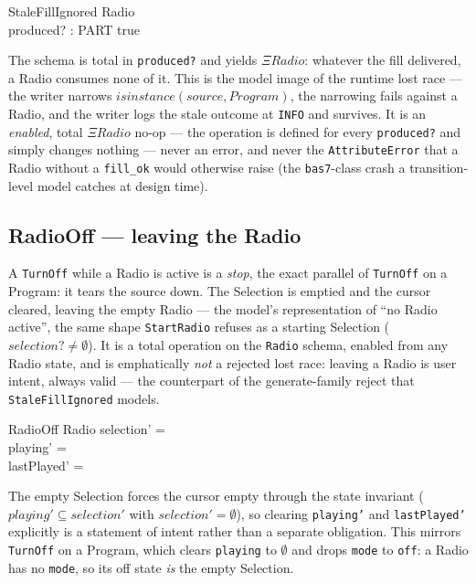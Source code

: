 \documentclass[a4paper,10pt,fleqn]{article}
\begin{document}
\begin{schema}{StaleFillIgnored}
  \Xi Radio \\
  produced? : PART
  \where
  true
\end{schema}

The schema is total in \texttt{produced?} and yields $\Xi Radio$: whatever the
fill delivered, a Radio consumes none of it. This is the model image of the
runtime lost race --- the writer narrows $isinstance(source, Program)$, the
narrowing fails against a Radio, and the writer logs the stale outcome at
\texttt{INFO} and survives. It is an \emph{enabled}, total $\Xi Radio$ no-op ---
the operation is defined for every \texttt{produced?} and simply changes nothing
--- never an error, and
never the \texttt{AttributeError} that a Radio without a \texttt{fill\_ok} would
otherwise raise (the \texttt{bas7}-class crash a transition-level model catches
at design time).

\subsection{RadioOff --- leaving the Radio}

A \texttt{TurnOff} while a Radio is active is a \emph{stop}, the exact parallel
of \texttt{TurnOff} on a Program: it tears the source down. The Selection is
emptied and the cursor cleared, leaving the empty Radio --- the model's
representation of ``no Radio active'', the same shape \texttt{StartRadio} refuses
as a starting Selection ($selection? \neq \emptyset$). It is a total operation on
the \texttt{Radio} schema, enabled from any Radio state, and is emphatically
\emph{not} a rejected lost race: leaving a Radio is user intent, always valid ---
the counterpart of the generate-family reject that \texttt{StaleFillIgnored}
models.

\begin{schema}{RadioOff}
  \Delta Radio
  \where
  selection' = \emptyset \\
  playing' = \emptyset \\
  lastPlayed' = \emptyset
\end{schema}

The empty Selection forces the cursor empty through the state invariant
($playing' \subseteq selection'$ with $selection' = \emptyset$), so clearing
\texttt{playing'} and \texttt{lastPlayed'} explicitly is a statement of intent
rather than a separate obligation. This mirrors \texttt{TurnOff} on a Program,
which clears \texttt{playing} to $\emptyset$ and drops \texttt{mode} to
\texttt{off}: a Radio has no \texttt{mode}, so its off state \emph{is} the empty
Selection.
\end{document}
